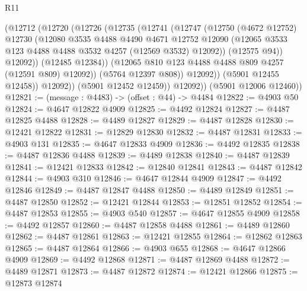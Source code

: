 \begin{lexlean}{R11}
\begin{coremodule}
                    (@12712
                      (@12720
                        (@12726
                          (@12735
                            (@12741
                              (@12747
                                (@12750
                                  (@4672 @12752)
                                  @12730
                                  (@12080
                                    @3535
                                    @4488
                                    @4490
                                    @4671
                                    @12752
                                    @12090
                                    (@12065
                                      @3533
                                      @123
                                      @4488
                                      @4488
                                      @3532
                                      @4257
                                      (@12569 @3532)
                                      @12092))
                                  (@12575 @94))
                                @12092))
                            (@12485 @12384))
                          (@12065 @810 @123 @4488 @4488 @809 @4257 (@12591 @809) @12092))
                        (@5764 @12397 @808))
                      @12092))
                  (@5901 @12455 @12458))
                @12092))
            (@5901 @12452 @12459))
          @12092))
      (@5901 @12006 @12460))
@12821 := (message : @4483) -> (offset : @44) -> @4484
@12822 := @4903 @50
@12824 := @4647 @12822 @4909
@12825 := @4492 @12824
@12827 := @4487 @12825 @4488
@12828 := @4489 @12827
@12829 := @4487 @12828
@12830 := @12421 @12822
@12831 := @12829 @12830
@12832 := @4487 @12831
@12833 := @4903 @131
@12835 := @4647 @12833 @4909
@12836 := @4492 @12835
@12838 := @4487 @12836 @4488
@12839 := @4489 @12838
@12840 := @4487 @12839
@12841 := @12421 @12833
@12842 := @12840 @12841
@12843 := @4487 @12842
@12844 := @4903 @310
@12846 := @4647 @12844 @4909
@12847 := @4492 @12846
@12849 := @4487 @12847 @4488
@12850 := @4489 @12849
@12851 := @4487 @12850
@12852 := @12421 @12844
@12853 := @12851 @12852
@12854 := @4487 @12853
@12855 := @4903 @540
@12857 := @4647 @12855 @4909
@12858 := @4492 @12857
@12860 := @4487 @12858 @4488
@12861 := @4489 @12860
@12862 := @4487 @12861
@12863 := @12421 @12855
@12864 := @12862 @12863
@12865 := @4487 @12864
@12866 := @4903 @655
@12868 := @4647 @12866 @4909
@12869 := @4492 @12868
@12871 := @4487 @12869 @4488
@12872 := @4489 @12871
@12873 := @4487 @12872
@12874 := @12421 @12866
@12875 := @12873 @12874

\end{coremodule}
\end{lexlean}
